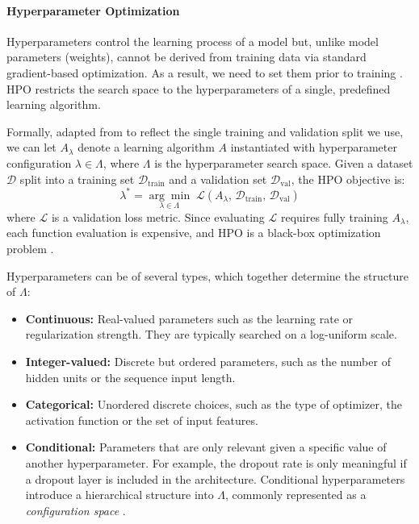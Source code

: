 \paragraph{Hyperparameter Optimization}
\label{subsubsection:HPO}
Hyperparameters control the learning process of a model but, unlike model parameters (weights), cannot be derived from training data via standard gradient-based optimization. As a result, we need to set them prior to training \parencite{hutter2019automated}. \acf{HPO} restricts the search space to the hyperparameters of a single, predefined learning algorithm.


Formally, adapted from \textcite{AutoMLHoos} to reflect the single training and validation split we use, we can let $A_\lambda$ denote a learning algorithm $A$ instantiated with hyperparameter configuration $\lambda \in \Lambda$, where $\Lambda$ is the
hyperparameter search space. Given a dataset $\mathcal{D}$ split into a training set $\mathcal{D}_\text{train}$ and a validation set
$\mathcal{D}_\text{val}$, the \ac{HPO} objective is:
\begin{equation}
    \lambda^* = \underset{\lambda \in \Lambda}{\arg\min}\;
    \mathcal{L}\!\left(A_\lambda,\, \mathcal{D}_\text{train},\,
    \mathcal{D}_\text{val}\right)
    \label{eq:hpo}
\end{equation}
where $\mathcal{L}$ is a validation loss metric. Since evaluating $\mathcal{L}$ requires fully training $A_\lambda$, each function evaluation is expensive, and \ac{HPO} is a black-box optimization problem .

Hyperparameters can be of several types, which together determine the structure of $\Lambda$:
\begin{itemize}
    \item \textbf{Continuous:} Real-valued parameters such as the learning
    rate or regularization strength. They are typically searched on a
    log-uniform scale.
    \item \textbf{Integer-valued:} Discrete but ordered parameters, such as
    the number of hidden units or the sequence input length.
    \item \textbf{Categorical:} Unordered discrete choices, such as the
    type of optimizer, the activation function or the set of input features.
    \item \textbf{Conditional:} Parameters that are only relevant given a
    specific value of another hyperparameter. For example, the dropout rate
    is only meaningful if a dropout layer is included in the architecture.
    Conditional hyperparameters introduce a hierarchical structure into
    $\Lambda$, commonly represented as a \emph{configuration space}
    \parencite{hutter2019automated}.
\end{itemize}


